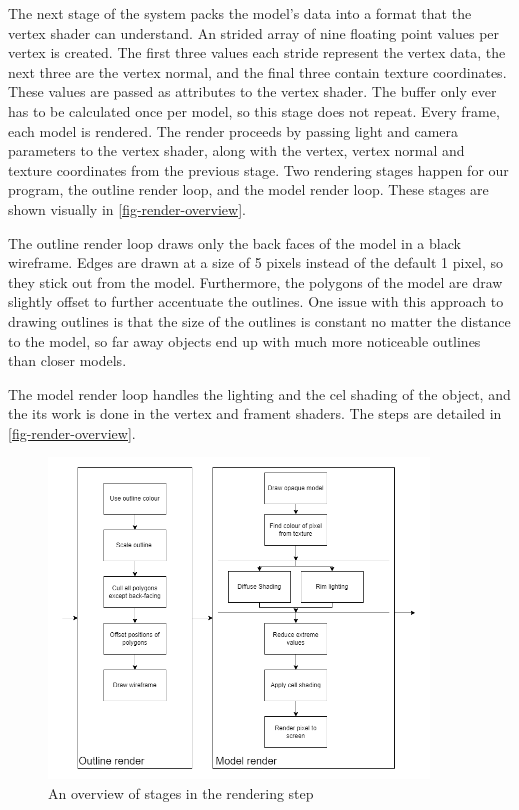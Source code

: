 The next stage of the system packs the model's data into a format that the vertex shader can 
understand. An strided array of nine floating point values per vertex is created. The first three
values each stride represent the vertex data, the next three are the vertex normal, and the final 
three contain texture coordinates. These values are passed as attributes to the vertex shader.
The buffer only ever has to be calculated once per model, so this stage does not repeat. 
Every frame, each model is rendered. The render proceeds by passing light and camera parameters to 
the vertex shader, along with the vertex, vertex normal and texture coordinates from the previous 
stage. Two rendering stages happen for our program, the outline render loop, and the model render
loop. These stages are shown visually in \autoref{fig-render-overview}.

The outline render loop draws only the back faces of the model in a black wireframe. Edges
are drawn at a size of 5 pixels instead of the default 1 pixel, so they stick out from the model.
Furthermore, the polygons of the model are draw slightly offset to further accentuate the outlines.
One issue with this approach to drawing outlines is that the size of the outlines is constant no 
matter the distance to the model, so far away objects end up with much more noticeable outlines
than closer models.


The model render loop handles the lighting and the cel shading of the object, and the its work is
done in the vertex and frament shaders. The steps are detailed in \autoref{fig-render-overview}.

\begin{figure}[h]
    \centering
    \includegraphics[width=0.9\textwidth]{img/rendering-overview.png}
    \caption{An overview of stages in the rendering step}
    \label{fig-render-overview}
\end{figure}

